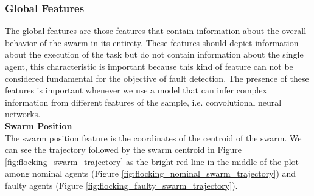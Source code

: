 \documentclass[../../Thesis.tex]{subfiles}
\begin{document}
			\subsubsection{Global Features}
				The global features are those features that contain information about the overall behavior of the swarm in its entirety. These features should depict information about the execution of the task but do not contain information about the single agent, this characteristic is important because this kind of feature can not be considered fundamental for the objective of fault detection. The presence of these features is important whenever we use a model that can infer complex information from different features of the sample, i.e. convolutional neural networks.\\
				\textbf{Swarm Position} \\
				The swarm position feature is the coordinates of the centroid of the swarm. We can see the trajectory followed by the swarm centroid in Figure \ref{fig:flocking_swarm_trajectory} as the bright red line in the middle of the plot among nominal agents (Figure \ref{fig:flocking_nominal_swarm_trajectory}) and faulty agents (Figure \ref{fig:flocking_faulty_swarm_trajectory}).
\end{document}
